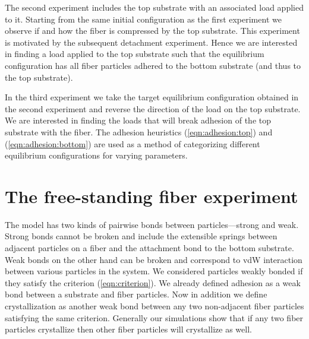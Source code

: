 The second experiment includes the top substrate with an associated load applied to it. Starting from the same initial configuration as the first experiment we observe if and how the fiber is compressed by the top substrate. This experiment is motivated by the subsequent detachment experiment. Hence we are interested in finding a load applied to the top substrate such that the equilibrium configuration has all fiber particles adhered to the bottom substrate (and thus to the top substrate).

In the third experiment we take the target equilibrium configuration obtained in the second experiment and reverse the direction of the load on the top substrate. We are interested in finding the loads that will break adhesion of the top substrate with the fiber. The adhesion heuristics (\ref{eqn:adhesion:top}) and (\ref{eqn:adhesion:bottom}) are used as a method of categorizing different equilibrium configurations for varying parameters.

\section{The free-standing fiber experiment}

The model has two kinds of pairwise bonds between particles---strong and weak. Strong bonds cannot be broken and include the extensible springs between adjacent particles on a fiber and the attachment bond to the bottom substrate. Weak bonds on the other hand can be broken and correspond to vdW interaction between various particles in the system. We considered particles weakly bonded if they satisfy the criterion (\ref{eqn:criterion}). We already defined adhesion as a weak bond between a substrate and fiber particles. Now in addition we define crystallization as another weak bond between any two non-adjacent fiber particles satisfying the same criterion. Generally our simulations show that if any two fiber particles crystallize then other fiber particles will crystallize as well.

